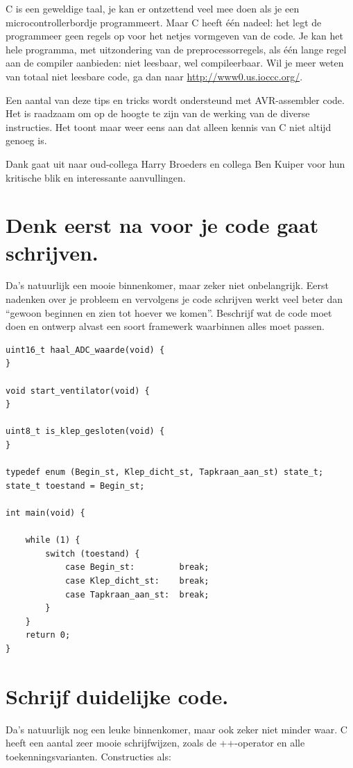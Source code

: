\documentclass[12pt,a4paper,final,twoside,fleqn]{article}
\begin{document}
C is een geweldige taal, je kan er ontzettend veel mee doen als je een
microcontrollerbordje programmeert. Maar C heeft \'{e}\'{e}n nadeel: het
legt de programmeer geen regels op voor het netjes vormgeven van de code.
Je kan het hele programma, met uitzondering van de preprocessorregels, als
\'{e}\'{e}n lange regel aan de compiler aanbieden: niet leesbaar, wel
compileerbaar. Wil je meer weten van totaal niet leesbare code, ga dan naar
\url{http://www0.us.ioccc.org/}.

Een aantal van deze tips en tricks wordt ondersteund met AVR-assembler code.
Het is raadzaam om op de hoogte te zijn van de werking van de diverse instructies.
Het toont maar weer eens aan dat alleen kennis van C niet altijd genoeg is.

Dank gaat uit naar oud-collega Harry Broeders en collega Ben Kuiper voor hun kritische
blik en interessante aanvullingen.


\newpage
\section{Denk eerst na voor je code gaat schrijven.}

Da's natuurlijk een mooie binnenkomer, maar zeker niet onbelangrijk. Eerst
nadenken over je probleem en vervolgens je code schrijven werkt veel beter
dan ``gewoon beginnen en zien tot hoever we komen''. Beschrijf wat de code
moet doen en ontwerp alvast een soort framewerk waarbinnen alles moet passen.

\begin{lstlisting}[style=C,caption=Voorbeeld van een framework]
uint16_t haal_ADC_waarde(void) {
}

void start_ventilator(void) {
}

uint8_t is_klep_gesloten(void) {
}

typedef enum (Begin_st, Klep_dicht_st, Tapkraan_aan_st) state_t;
state_t toestand = Begin_st;

int main(void) {

	while (1) {
		switch (toestand) {
			case Begin_st:         break;
			case Klep_dicht_st:    break;
			case Tapkraan_aan_st:  break;
		}
	}
	return 0;
}
\end{lstlisting}


\section{Schrijf duidelijke code.}

Da's natuurlijk nog een leuke binnenkomer, maar ook zeker niet minder waar.
C heeft een aantal zeer mooie schrijfwijzen, zoals de ++-operator en alle
toekenningsvarianten. Constructies als: 
\end{document}
